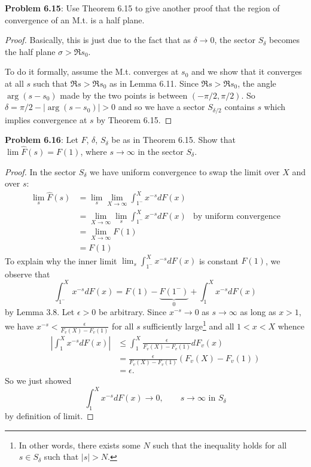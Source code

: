 \documentclass[12pt]{article}
\newcommand{\Fhat}{\widehat{F}}
\newcommand{\Abs}[1]{\left| #1 \right|}
\begin{document}
\fi

\textbf{Problem 6.15}: Use Theorem 6.15 to give another proof that the region of convergence of an M.t. is a half plane.

\begin{proof}
Basically, this is just due to the fact that as $\delta \rightarrow 0$, the sector $S_\delta$ becomes the half plane $\sigma > \Re s_0$.

To do it formally, assume the M.t. converges at $s_0$ and we show that it converges at all $s$ such that $\Re s > \Re s_0$ as in Lemma 6.11. Since $\Re s > \Re s_0$, the angle $\arg(s - s_0)$ made by the two points is between $(-\pi/2, \pi/2)$. So $\delta = \pi/2 - |\arg(s - s_0)| > 0$ and so we have a sector $S_{\delta/2}$ contains $s$ which implies convergence at $s$ by Theorem 6.15.
\end{proof}

\textbf{Problem 6.16}: Let $F$, $\delta$, $S_\delta$ be as in Theorem 6.15. Show that $\lim \Fhat(s) = F(1)$, where $s \rightarrow \infty$ in the sector $S_\delta$.

\begin{proof}
In the sector $S_\delta$ we have uniform convergence to swap the limit over $X$ and over $s$:
\begin{align*}
\lim_s \Fhat(s) &= \lim_s \lim_{X \rightarrow \infty} \int_{1^-}^X x^{-s} dF(x)\\
&= \lim_{X \rightarrow \infty} \lim_s \int_{1^-}^X x^{-s} dF(x) &\text{by uniform convergence}\\
&= \lim_{X \rightarrow \infty} F(1)\\
&= F(1)
\end{align*}
To explain why the inner limit $\lim_s \int_{1^-}^X x^{-s} dF(x)$ is constant $F(1)$, we observe that
$$\int_{1^-}^X x^{-s} dF(x) = F(1) - \underbrace{F(1^-)}_{0} + \int_1^X x^{-s} dF(x)$$
by Lemma 3.8. Let $\epsilon > 0$ be arbitrary. Since $x^{-s} \rightarrow 0$ as $s \rightarrow \infty$ as long as $x > 1$, we have $x^{-s} < \frac{\epsilon}{F_v(X) - F_v(1)}$ for all $s$ sufficiently large\footnote{In other words, there exists some $N$ such that the inequality holds for all $s \in S_\delta$ such that $|s| > N$.} and all $1 < x < X$ whence
\begin{align*}
\Abs{ \int_1^X x^{-s} dF(x) } &\leq \int_1^X \frac{\epsilon}{F_v(X) - F_v(1)} dF_v(x)\\
&= \frac{\epsilon}{F_v(X) - F_v(1)} (F_v(X) - F_v(1))\\
&= \epsilon.
\end{align*}
So we just showed
$$\int_1^X x^{-s} dF(x) \rightarrow 0, \qquad s \rightarrow \infty \text{ in } S_\delta$$
by definition of limit.
\end{proof}
\end{document}
